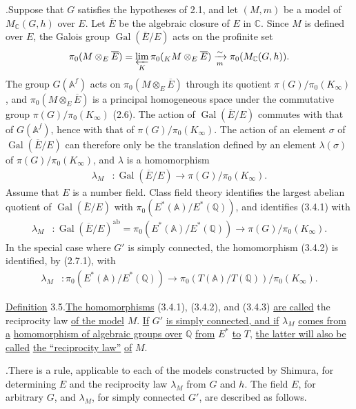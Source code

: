\documentclass[10pt]{article}
\newcommand{\A}{\mathbb A}
\newcommand{\Af}{\mathbb A^f}
\newcommand{\C}{\mathbb C}
\newcommand{\Q}{\mathbb Q}
\newcommand{\Gal}{\operatorname{Gal}}
\newcommand{\limproj}{\varprojlim}
\newcommand{\MC}{M_{\C}}
\newcommand{\ab}{\mathrm{ab}}
\begin{document}
.\quad Suppose that $G$ satisfies the hypotheses of 2.1, and let $(M,m)$ be a model of $\MC(G,h)$ over $E$. Let $\overline E$ be the algebraic closure of $E$ in $\C$. Since $M$ is defined over $E$, the Galois group $\Gal(\overline E/E)$ acts on the profinite set
\[
\pi_0(M\otimes_E\overline E)=\limproj_K\pi_0({}_K M\otimes_E\overline E)\xrightarrow[m]{\sim}\pi_0(\MC(G,h)).
\]
The group $G(\Af)$ acts on $\pi_0(M\otimes_E\overline E)$ through its quotient $\pi(G)/\pi_0(K_\infty)$, and $\pi_0(M\otimes_E\overline E)$
is a principal homogeneous space under the commutative group $\pi(G)/\pi_0(K_\infty)$ (2.6). The action of $\Gal(\overline E/E)$ commutes with that of $G(\Af)$, hence with that of $\pi(G)/\pi_0(K_\infty)$. The action of an element $\sigma$ of $\Gal(\overline E/E)$ can therefore only be the translation defined by an element $\lambda(\sigma)$ of $\pi(G)/\pi_0(K_\infty)$, and $\lambda$ is a homomorphism
\begingroup
\makeatletter
\tagsleft@true
\makeatother
\begin{align}
\lambda_M&:\Gal(\overline E/E)\longrightarrow \pi(G)/\pi_0(K_\infty). \tag{3.4.1}
\end{align}
\endgroup
Assume that $E$ is a number field. Class field theory identifies the largest abelian quotient of $\Gal(\overline E/E)$ with $\pi_0(E^*(\A)/E^*(\Q))$, and identifies (3.4.1) with
\begingroup
\makeatletter
\tagsleft@true
\makeatother
\begin{align}
\lambda_M&:\Gal(\overline E/E)^{\ab}=\pi_0(E^*(\A)/E^*(\Q))\longrightarrow\pi(G)/\pi_0(K_\infty). \tag{3.4.2}
\end{align}
\endgroup
In the special case where $G'$ is simply connected, the homomorphism (3.4.2) is identified, by (2.7.1), with
\begingroup
\makeatletter
\tagsleft@true
\makeatother
\begin{align}
\lambda_M&:\pi_0(E^*(\A)/E^*(\Q))\longrightarrow\pi_0(T(\A)/T(\Q))/\pi_0(K_\infty). \tag{3.4.3}
\end{align}
\endgroup

\noindent\uline{Definition} 3.5.\quad \uline{The homomorphisms} (3.4.1), (3.4.2), and (3.4.3) \uline{are called} the reciprocity law \uline{of the model} $M$. \uline{If} $G'$ \uline{is simply connected, and if} $\lambda_M$ \uline{comes from a} \uline{homomorphism of algebraic groups over} $\Q$ \uline{from} $E^*$ \uline{to} $T$, \uline{the latter will also be called} \uline{the ``reciprocity law''} \uline{of} $M$.

.\quad There is a rule, applicable to each of the models constructed by Shimura, for determining $E$ and the reciprocity law $\lambda_M$ from $G$ and $h$. The field $E$, for arbitrary $G$, and $\lambda_M$, for simply connected $G'$, are described as follows.
\end{document}
